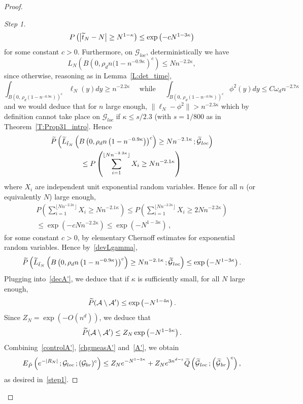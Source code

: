 \documentclass[AHL, Unicode, longabstracts, published]{cedram}
\newenvironment{step}[1]{\begin{proof}[#1]}{\let\qed\relax\end{proof}}
\newcommand{\Pmh}{P}
\newcommand*\E {{E}}
\newcommand{\cA}{\mathcal{A}}
\newcommand{\cG}{\mathcal{G}}
\newcommand*\Q{{Q}}
\newcommand*\eps{\varepsilon}
\let\oldtilde\tilde
\renewcommand*{\tilde}[1]{\mathchoice{\widetilde{#1}}{\widetilde{#1}}{\oldtilde{#1}}{\oldtilde{#1}}}\let\oldhat\hat
\renewcommand*{\hat}[1]{\mathchoice{\widehat{#1}}{\widehat{#1}}{\oldhat{#1}}{\oldhat{#1}}}\let\oldexists\exists
\renewcommand*{\exists}{\mathrel{\oldexists}}
\begin{document}
\begin{proof}
\begin{step}{Step 1}
\begin{equation}\label{devtN}
\Pmh\left(\left|\tilde t_N - N\right| \ge N^{1- \kappa}\right) \le \exp\left(- c N^{1- 3 \kappa}\right)
\end{equation}
for some constant $c>0$. Furthermore, on $\cG_{loc}$, deterministically we have
\[
L_N \left(B\left(0, \rho_d n (1- n^{ - 0.9 \kappa}\right)^c\right) \le N n^{-2.2 \kappa},
\]
since otherwise, reasoning as in Lemma~\ref{L:det_time},
\[
\int_{B(0,\,\rho_d (1- n^{ - 0.9 \kappa}))^c} \ell_N (y) dy \ge n^{-2.2 \kappa}\quad\text{ while }\quad\int_{B(0,\,\rho_d (1- n^{ - 0.9 \kappa}))^c} \phi^2(y) dy \le C \omega_d n^{- 2.7 \kappa}
\]
and we would deduce that for $n$ large enough, $\| \ell_N - \phi^2\| >n^{-2.3\kappa}$ which by definition cannot take place on $\cG_{loc}$ if $\kappa \le s/2.3$ (with $s = 1/800 $ as in Theorem~\ref{T:Prop31_intro}. Hence
\begin{multline}\label{devLgamma}
\tilde \Pmh \left(\tilde L_{\tilde t_N} \left(B\left(0, \rho_d n\left(1- n^{ - 0.9 \kappa}\right)\right)^c\right) \ge Nn^{- 2.1 \kappa}\,; \tilde \cG_{loc}\right)\\
\le \Pmh\left(\sum_{i=1}^{ \lfloor Nn^{-2.2 \kappa}\rfloor } X_i \ge Nn^{- 2.1\kappa}\right)
\end{multline}
where $X_i$ are independent unit exponential random variables. Hence for all $n$ (or equivalently $N$) large enough,
\begin{multline*}
\Pmh\left(\sum_{i=1}^{ \lfloor Nn^{-2.2 \kappa}\rfloor } X_i \ge Nn^{-2.1 \kappa}\right) \le
\Pmh\left(\sum_{i=1}^{ \lfloor Nn^{-2.2 \kappa}\rfloor } X_i \ge 2 Nn^{-2.2 \kappa}\right) \\
\le \exp \left(- c N n^{-2.2 \kappa}\right) \le \exp \left(- N^{1 - 3\kappa}\right)\,,
\end{multline*}
for some constant $c>0$, by elementary Chernoff estimates for exponential random variables. Hence by~\eqref{devLgamma},
\[
\tilde \Pmh \left(\tilde L_{\tilde t_N} \left(B\left(0, \rho_d n\left(1- n^{ - 0.9 \kappa}\right)\right)^c\right) \ge Nn^{-2.1 \kappa}\,; \tilde \cG_{loc}\right) \le \exp\left(- N^{1- 3 \kappa}\right).
\]
Plugging into~\eqref{decA'}, we deduce that if $\kappa$ is sufficiently small, for all $N$ large enough,
\[
\tilde \Pmh(\cA \setminus \cA') \le \exp \left(- N^{1 - 4 \kappa}\right).
\]
Since $Z_N = \exp (- O(n^d))$, we deduce that
\begin{equation}\label{controlA'}
\tilde \Pmh(\cA \setminus \cA') \le Z_N \exp\left(- N^{1- 5 \kappa}\right).
\end{equation}
Combining~\eqref{controlA'}, \eqref{chgmeasA'} and~\eqref{A'}, we obtain
\[
\E_{\tilde \Pmh} \left(e^{- |R_N|}\,; \cG_{loc}\,; (\cG_{br})^c\right) \le Z_N e^{- N^{1- 5 \kappa}} + Z_N e^{3 n^{d- \eps}} \tilde \Q\left(\tilde \cG_{loc}\,; \left(\tilde \cG_{br}\right)^c\right),
\]
as desired in~\eqref{step1}.
\end{step}


\end{proof}
\end{document}
